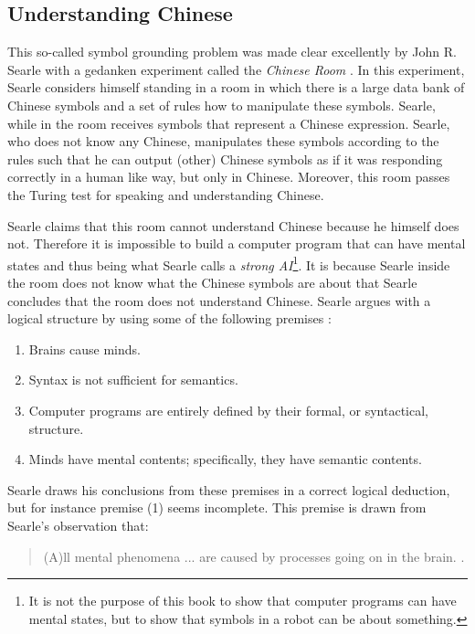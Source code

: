 \subsection{Understanding Chinese}


\bigskip\noindent
{}
This so-called symbol grounding problem was made clear excellently by John R. Searle with a gedanken experiment called the {\em Chinese Room} \citep{searle:1980}. In this experiment, Searle considers himself standing in a room in which there is a large data bank of Chinese symbols and a set of rules how to manipulate these symbols. Searle, while in the room receives symbols that represent a Chinese expression. Searle, who does not know any Chinese, manipulates these symbols according to the rules such that he can output (other) Chinese symbols as if it was responding correctly in a human like way, but only in Chinese. Moreover, this room passes the Turing test for speaking and understanding Chinese.

Searle claims that this room cannot understand Chinese because he himself does not. Therefore it is impossible to build a computer program that can have mental states and thus being what Searle calls a {\em strong AI}\footnote{It is not the purpose of this book to show that computer programs can have mental states, but to show that symbols in a robot can be about something.}. It is because Searle inside the room does not know what the Chinese symbols are about that Searle concludes that the room does not understand Chinese. Searle argues with a logical structure by using some of the following premises \cite[p. 39]{searle:1984}:

\begin{enumerate}
\item Brains cause minds.
\item Syntax is not sufficient for semantics.
\item Computer programs are entirely defined by their formal, or syntactical, structure.
\item Minds have mental contents; specifically, they have semantic contents.
\end{enumerate}

Searle draws his conclusions from these premises in a correct logical deduction, but for instance premise (1) seems incomplete. This premise is drawn from Searle's observation that:

\begin{quote}
(A)ll mental phenomena ... are caused by processes going on in the brain. \cite[p. 18]{searle:1984}.
\end{quote}

